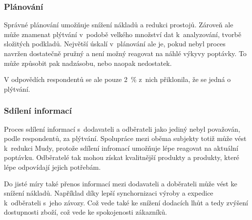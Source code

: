 \subsubsection*{Plánování}

Správné plánování umožňuje snížení nákladů a redukci prostojů. Zároveň ale může znamenat plýtvání v~podobě velkého množství dat k~analyzování, tvorbě složitých podkladů. Největší úskalí v~plánování ale je, pokud nebyl proces navržen dostatečně pružný a není možný reagovat na náhlé výkyvy poptávky. To může způsobit pak nadzásobu, nebo naopak nedostatek.

V odpovědích respondentů se ale pouze 2~\% z~nich přiklonila, že se jedná o plýtvání. 

\subsubsection*{Sdílení informací}

Proces sdílení informací s~dodavateli a odběrateli jako jediný nebyl považován, podle respondentů, za plýtvání. Spolupráce mezi oběma subjekty totiž může vést k~redukci Mudy, protože sdílení infromací umožňuje lépe reagovat na aktuální poptávku. Odběratelé tak mohou získat kvalitnější produkty a produkty, které lépe odpovídají jejich potřebám.

Do jisté míry také přenos informací mezi dodavateli a doběrateli může vést ke snížení nákladů. Například díky lepší synchornizaci výroby a expedice k~odběrateli s~jeho závozy. Což vede také ke snížení dodacích lhůt a tedy zvýšení dostupnosti zboží, což vede ke spokojenosti zákazníků.